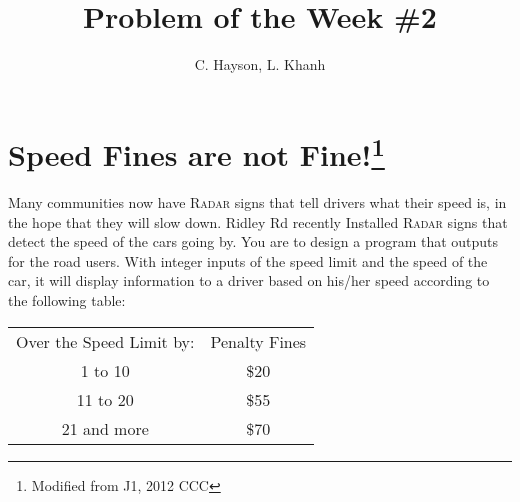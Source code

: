 \documentclass[12pt]{article}
\title{\textbf{Problem of the Week \#2}}
\author{C. Hayson, L. Khanh}
\begin{document}
\maketitle
\section*{Speed Fines are not Fine!\footnote{Modified from J1, 2012 CCC}}
Many communities now have \textsc{Radar} signs that tell drivers what their speed is, in the hope that
they will slow down. Ridley Rd recently Installed \textsc{Radar} signs that detect the speed of the cars going by. You are to design a program that outputs for the road users. With integer inputs of the speed limit and the speed of the car, it will display information to a driver based on his/her speed according to the following table:
\begin{table}[h!]
    \centering
    \begin{tabular}{c|c}
        Over the Speed Limit by: & Penalty Fines \\ \hhline{|=|=|}
        1 to 10 & \$20 \\
        11 to 20 & \$55 \\
        21 and more & \$70 \\
    \end{tabular}
    \label{tab:my_label}
\end{table}
\end{document}
